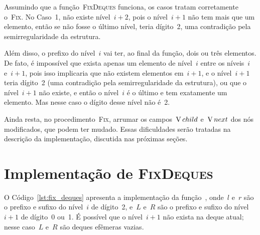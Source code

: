 \documentclass[../../main.tex]{subfiles}
\begin{document}
Assumindo que a função~\textsc{FixDeques} funciona, os casos tratam corretamente o~\textsc{Fix}. No Caso~1, não existe nível~${i+2}$, pois o nível~${i+1}$ não tem mais que um elemento, então se não fosse o último nível, teria dígito~2, uma contradição pela semirregularidade da estrutura.

Além disso, o prefixo do nível~$i$ vai ter, ao final da função, dois ou três elementos. De fato, é impossível que exista apenas um elemento de nível~$i$ entre os níveis~$i$ e~$i+1$, pois isso implicaria que não existem elementos em~$i+1$, e o nível~$i+1$ teria dígito~2 (uma contradição pela semirregularidade da estrutura), ou que o nível~${i+1}$ não existe, e então o nível~$i$ é o último e tem exatamente um elemento. Mas nesse caso o dígito desse nível não é~2.

Ainda resta, no procedimento~\textsc{Fix}, arrumar os campos~$\operatorname{V}{child}$ e~$\operatorname{V}{next}$ dos nós modificados, que podem ter mudado. Essas dificuldades serão tratadas na descrição da implementação, discutida nas próximas seções.

\section{Implementação de {\normalfont \textsc{FixDeques}}} \label{sec:fix_deques}

O Código~\ref{lst:fix_deques} apresenta a implementação da função~, onde~$l$ e~$r$ são o prefixo e sufixo do nível~$i$ de dígito~2, e~$L$ e~$R$ são o prefixo e sufixo do nível~$i+1$ de dígito~0 ou~1. É possível que o nível~$i+1$ não exista na deque atual; nesse caso~$L$ e~$R$ são deques efêmeras vazias.
\end{document}
